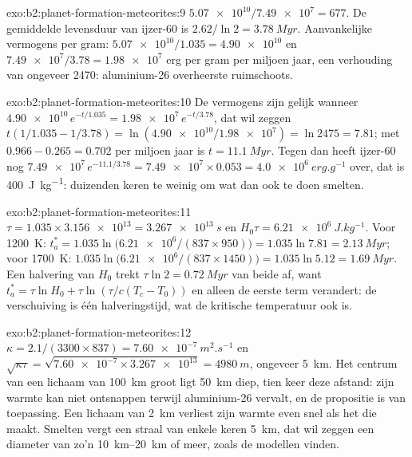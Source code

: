 \begin{solution}{exo:b2:planet-formation-meteorites:9}
$\num{5.07e10}/\num{7.49e7} = 677$. De gemiddelde levensduur van ijzer-60 is
$2.62/\ln2 = \qty{3.78}{Myr}$. Aanvankelijke vermogens per gram:
$\num{5.07e10}/1.035 = \num{4.90e10}$ en $\num{7.49e7}/3.78 = \num{1.98e7}$ erg per
gram per miljoen jaar, een verhouding van ongeveer \num{2470}: aluminium-26 overheerste ruimschoots.
\end{solution}

\begin{solution}{exo:b2:planet-formation-meteorites:10}
De vermogens zijn gelijk wanneer $\num{4.90e10}\,e^{-t/1.035} = \num{1.98e7}\,e^{-t/3.78}$,
dat wil zeggen $t(1/1.035 - 1/3.78) = \ln(\num{4.90e10}/\num{1.98e7}) = \ln 2475 = 7.81$;
met $0.966 - 0.265 = 0.702$ per miljoen jaar is $t = \qty{11.1}{Myr}$. Tegen dan
heeft ijzer-60 nog $\num{7.49e7}\,e^{-11.1/3.78} = \num{7.49e7}\times0.053 =
\qty{4.0e6}{erg.g^{-1}}$ over, dat is \qty{400}{J.kg^{-1}}: duizenden keren te
weinig om wat dan ook te doen smelten.
\end{solution}

\begin{solution}{exo:b2:planet-formation-meteorites:11}
$\tau = 1.035\times\num{3.156e13} = \qty{3.267e13}{s}$ en
$H_0\tau = \qty{6.21e6}{J.kg^{-1}}$. Voor \qty{1200}{K}:
$t_a^* = 1.035\ln\bigl(\num{6.21e6}/(837\times950)\bigr) = 1.035\ln7.81 =
\qty{2.13}{Myr}$; voor \qty{1700}{K}: $1.035\ln\bigl(\num{6.21e6}/(837\times1450)\bigr)
= 1.035\ln5.12 = \qty{1.69}{Myr}$. Een halvering van $H_0$ trekt $\tau\ln2 =
\qty{0.72}{Myr}$ van beide af, want $t_a^* = \tau\ln H_0 + \tau\ln(\tau/c(T_c -
T_0))$ en alleen de eerste term verandert: de verschuiving is één halveringstijd, wat de
kritische temperatuur ook is.
\end{solution}

\begin{solution}{exo:b2:planet-formation-meteorites:12}
$\kappa = 2.1/(3300\times837) = \qty{7.60e-7}{m^2.s^{-1}}$ en
$\sqrt{\kappa\tau} = \sqrt{\num{7.60e-7}\times\num{3.267e13}} = \qty{4980}{m}$,
ongeveer \qty{5}{km}. Het centrum van een lichaam van \qty{100}{km} groot ligt \qty{50}{km} diep,
tien keer deze afstand: zijn warmte kan niet ontsnappen terwijl aluminium-26 vervalt, en de
propositie is van toepassing. Een lichaam van \qty{2}{km} verliest zijn warmte even snel als het
die maakt. Smelten vergt een straal van enkele keren \qty{5}{km}, dat wil zeggen een diameter van zo'n
\qtyrange{10}{20}{km} of meer, zoals de modellen vinden.
\end{solution}

